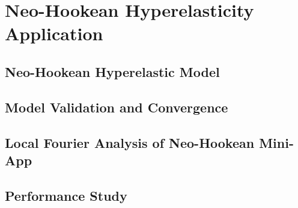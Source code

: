 \chapter{Neo-Hookean Hyperelasticity Application}\label{ch:SolidMechanics}


\section{Neo-Hookean Hyperelastic Model}\label{sec:solidsmodel}


\section{Model Validation and Convergence}\label{sec:solidsconvergence}


\section{Local Fourier Analysis of Neo-Hookean Mini-App}\label{sec:solidslocalfourieranalysis}


\section{Performance Study}\label{sec:solidsperformance}


